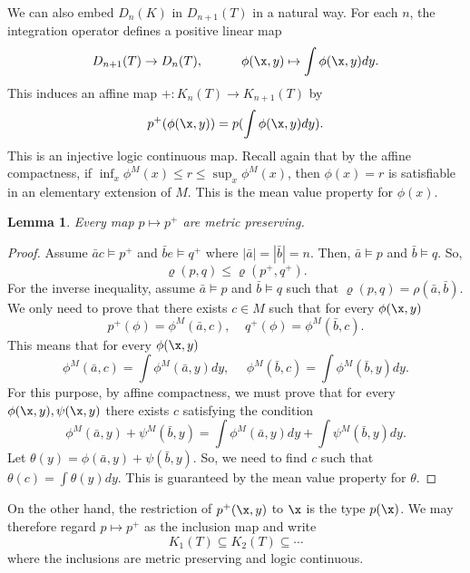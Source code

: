 \documentclass[12pt]{article}
\newtheorem{lemma}[theorem]{Lemma}
\def\a{\bar {a}}\def\b{\bar {b}}\def\c{\bar {c}}
\begin{document}
We can also embed $D_n(K)$ in $D_{n+1}(T)$ in a natural way. For each $n$, the integration operator defines a positive linear map
$$D_{n+1}(T)\rightarrow D_n(T),\ \ \ \ \ \ \ \ \ \phi(\x,y)\mapsto\int\phi(\x,y)dy.$$
This induces an affine map $+:K_{n}(T)\rightarrow K_{n+1}(T)$ by
$$p^+(\phi(\x,y))=p(\int\phi(\x,y)dy).$$
This is an injective logic continuous map. Recall again that by the affine compactness, if
$\inf_x\phi^M(x)\leqslant r\leqslant\sup_x\phi^M(x)$, then $\phi(x)=r$ is satisfiable in
an elementary extension of $M$. This is the mean value property for $\phi(x)$.

\begin{lemma}
Every map $p\mapsto p^+$ are metric preserving.
\end{lemma}
\begin{proof}
Assume $\a c\vDash p^+$ and $\b e\vDash q^+$ where $|\a|=|\b|=n$.
Then, $\a\vDash p$ and $\b\vDash q$.
So, $$\mathbf{\varrho}(p,q)\leqslant\varrho(p^+,q^+).$$
For the inverse inequality, assume $\a\vDash p$ and $\b\vDash q$ such that $\varrho(p,q)=\rho(\a,\b)$.
We only need to prove that there exists $c\in M$ such that for every $\phi(\x,y)$
$$p^+(\phi)=\phi^M(\a,c),\ \ \ \ \ q^+(\phi)=\phi^M(\b,c).$$
This means that for every $\phi(\x,y)$$$\phi^M(\a,c)=\int\phi^M(\a,y)dy,\ \ \ \ \ \ \phi^M(\b,c)=\int\phi^M(\b,y)dy.$$
For this purpose, by affine compactness, we must prove that for every $\phi(\x,y),\psi(\x,y)$ there exists $c$ satisfying the condition $$\phi^M(\a,y)+\psi^M(\b,y)=\int\phi^M(\a,y)dy+\int\psi^M(\b,y)dy.$$
Let $\theta(y)=\phi(\a,y)+\psi(\b,y)$.
So, we need to find $c$ such that $\theta(c)=\int\theta(y)dy$. This is guaranteed by the mean value property for $\theta$.
\end{proof}

On the other hand, the restriction of $p^+(\x,y)$ to $\x$ is the type $p(\x)$.
We may therefore regard $p\mapsto p^+$ as the inclusion map and write
$$K_1(T)\subseteq K_2(T)\subseteq\cdots$$ where the inclusions are metric preserving and logic continuous.
\end{document}
